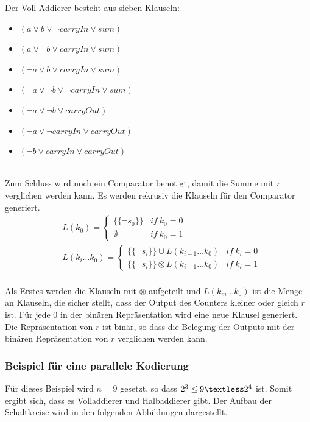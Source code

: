 \documentclass[a4,abstract=on]{scrartcl}
\begin{document}
Der Voll-Addierer besteht aus sieben Klauseln:
\begin{itemize}
\item $(a \vee b \vee \neg carryIn \vee sum)$
\item $( a \vee \neg b \vee carryIn \vee sum)$
\item $(\neg a \vee b \vee carryIn \vee sum )$
\item $(\neg a \vee \neg b \vee \neg carryIn \vee sum)$
\item$(\neg a \vee \neg b \vee carryOut)$
\item$(\neg a \vee \neg carryIn \vee carryOut)$
\item$(\neg b \vee carryIn \vee carryOut)$
\end{itemize}
\ \\
Zum Schluss wird noch ein Comparator benötigt, damit die Summe mit $r$ verglichen werden kann. Es werden rekrusiv die Klauseln für den Comparator generiert.
\begin{align*}
&L(k_0) = \begin{cases} \{\{\neg s_0\}\} & if{~}k_0 = 0\\ \emptyset & if{~}k_0=1\end{cases}\\
&L(k_i \dots k_0) = \begin{cases} \{\{\neg s_i\}\}\cup L(k_{i-1} \dots k_0) & if{~}k_i = 0\\  \{\{\neg s_i\}\}\otimes L(k_{i-1} \dots k_0) & if{~}k_i = 1\end{cases}
\end{align*}
\ \\
Als Erstes werden die Klauseln mit $\otimes$ aufgeteilt und $L(k_{m} \dots k_0)$ ist die Menge an Klauseln, die sicher stellt, dass der Output des Counters kleiner oder gleich $r$ ist. Für jede $0$ in der binären Repräsentation wird eine neue Klausel generiert.
Die Repräsentation von $r$ ist binär, so dass die Belegung der Outputs mit der binären Repräsentation von $r$ verglichen werden kann.

\subsubsection*{Beispiel für eine parallele Kodierung}
Für dieses Beispiel wird $n=9$ gesetzt, so dass $2^3 \leq 9 \textless 2^4$ ist. Somit ergibt sich, dass es Volladdierer und Halbaddierer gibt. Der Aufbau der Schaltkreise wird in den folgenden Abbildungen dargestellt.
\end{document}
